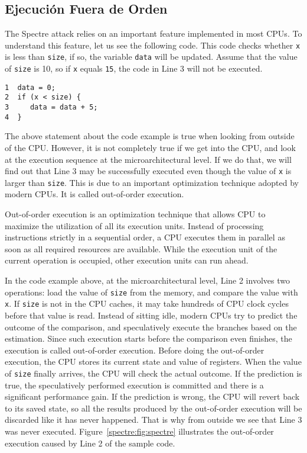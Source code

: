 \subsection{Ejecución Fuera de Orden} 

The Spectre attack relies on an important feature implemented in most
CPUs.  To understand this feature, let us see the following code. 
This code checks whether \texttt{x} is less than \texttt{size}, if so,
the variable \texttt{data} will be updated. Assume that the value of
\texttt{size} is 10, so if \texttt{x} equals \texttt{15}, 
the code in Line 3 will not be executed.  

\begin{lstlisting}
1  data = 0;
2  if (x < size) {   
3     data = data + 5; 
4  }
\end{lstlisting}
 

The above statement about the code example is true when looking from outside of the CPU.
However, it is not completely true if we get into the CPU, and look at the execution sequence
at the microarchitectural level. If we do that, we will find out that
Line 3 may be successfully executed even though the value of \texttt{x} is 
larger than \texttt{size}. This is due to an important optimization technique adopted by
modern CPUs. It is called out-of-order execution.


Out-of-order execution is an optimization technique that allows CPU to maximize the utilization of
all its execution units. Instead of processing instructions
strictly in a sequential order, a CPU executes them in parallel
as soon as all required resources are available.
While the execution unit of the current operation is occupied, other
execution units can run ahead.

In the code example above, at the microarchitectural level, Line 2 involves
two operations: load the value of \texttt{size} from the memory, 
and compare the value with \texttt{x}. If \texttt{size} is not in the CPU
caches, it may take hundreds of CPU clock cycles before that value is read.
Instead of sitting idle, modern CPUs try to predict the outcome 
of the comparison, and speculatively execute the branches based on
the estimation. Since such execution starts before the comparison even finishes,
the execution is called out-of-order execution. 
Before doing the out-of-order execution,  
the CPU stores its current state and value of registers. 
When the value of \texttt{size} finally arrives, 
the CPU will check the actual outcome. If the prediction is true, the speculatively
performed execution is committed and there is a significant performance gain. If the prediction
is wrong, the CPU will revert back to its saved state, 
so all the results produced by the out-of-order execution will be discarded like
it has never happened.  That is why from outside we see that Line 3 was
never executed.
Figure~\ref{spectre:fig:spectre} illustrates the out-of-order execution
caused by Line 2 of the sample code.


